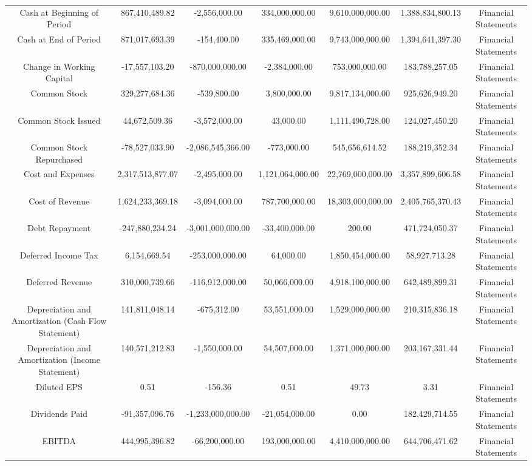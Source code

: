 \begin{longtable}{ccccccc}
Cash at Beginning of Period & 867,410,489.82 & -2,556,000.00 & 334,000,000.00 & 9,610,000,000.00 & 1,388,834,800.13 & Financial Statements \\
Cash at End of Period & 871,017,693.39 & -154,400.00 & 335,469,000.00 & 9,743,000,000.00 & 1,394,641,397.30 & Financial Statements \\
Change in Working Capital & -17,557,103.20 & -870,000,000.00 & -2,384,000.00 & 753,000,000.00 & 183,788,257.05 & Financial Statements \\
Common Stock & 329,277,684.36 & -539,800.00 & 3,800,000.00 & 9,817,134,000.00 & 925,626,949.20 & Financial Statements \\
Common Stock Issued & 44,672,509.36 & -3,572,000.00 & 43,000.00 & 1,111,490,728.00 & 124,027,450.20 & Financial Statements \\
Common Stock Repurchased & -78,527,033.90 & -2,086,545,366.00 & -773,000.00 & 545,656,614.52 & 188,219,352.34 & Financial Statements \\
Cost and Expenses & 2,317,513,877.07 & -2,495,000.00 & 1,121,064,000.00 & 22,769,000,000.00 & 3,357,899,606.58 & Financial Statements \\
Cost of Revenue & 1,624,233,369.18 & -3,094,000.00 & 787,700,000.00 & 18,303,000,000.00 & 2,405,765,370.43 & Financial Statements \\
Debt Repayment & -247,880,234.24 & -3,001,000,000.00 & -33,400,000.00 & 200.00 & 471,724,050.37 & Financial Statements \\
Deferred Income Tax & 6,154,669.54 & -253,000,000.00 & 64,000.00 & 1,850,454,000.00 & 58,927,713.28 & Financial Statements \\
Deferred Revenue & 310,000,739.66 & -116,912,000.00 & 50,066,000.00 & 4,918,100,000.00 & 642,489,899.31 & Financial Statements \\
Depreciation and Amortization (Cash Flow Statement) & 141,811,048.14 & -675,312.00 & 53,551,000.00 & 1,529,000,000.00 & 210,315,836.18 & Financial Statements \\
Depreciation and Amortization (Income Statement) & 140,571,212.83 & -1,550,000.00 & 54,507,000.00 & 1,371,000,000.00 & 203,167,331.44 & Financial Statements \\
Diluted EPS & 0.51 & -156.36 & 0.51 & 49.73 & 3.31 & Financial Statements \\
Dividends Paid & -91,357,096.76 & -1,233,000,000.00 & -21,054,000.00 & 0.00 & 182,429,714.55 & Financial Statements \\
EBITDA & 444,995,396.82 & -66,200,000.00 & 193,000,000.00 & 4,410,000,000.00 & 644,706,471.62 & Financial Statements \\

\end{longtable}
